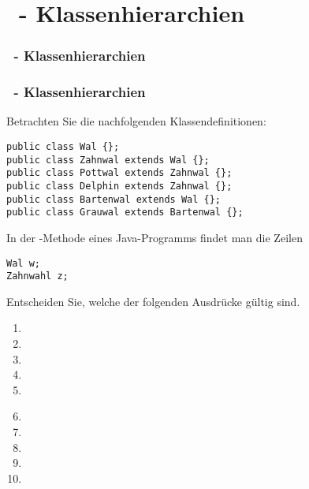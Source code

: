 \def\stitle{\theexercise\ - Klassenhierarchien}
\section{\stitle}
\begin{frame}%
  \frametitle{\stitle}%
\tableofcontents[current]
\end{frame}


\begin{frame}[fragile]%
  \frametitle{\stitle}%
Betrachten Sie die nachfolgenden Klassendefinitionen:

\begin{lstlisting}[style=java]
public class Wal {};
public class Zahnwal extends Wal {};
public class Pottwal extends Zahnwal {};
public class Delphin extends Zahnwal {};
public class Bartenwal extends Wal {};
public class Grauwal extends Bartenwal {};
\end{lstlisting}

In der -Methode eines Java-Programms findet man die Zeilen
\begin{lstlisting}[style=java,frame=none]
Wal w;
Zahnwahl z;
\end{lstlisting}

Entscheiden Sie, welche der folgenden Ausdr\"ucke g\"ultig sind.
\begin{center}
\begin{minipage}{0.49\textwidth}
\begin{enumerate}
\item {}
\item {}
\item {}
\item {}
\item {}
\end{enumerate}
\end{minipage}
\begin{minipage}{0.49\textwidth}
\begin{enumerate}
\setcounter{enumi}{5}
\item {}
\item {}
\item {}
\item {}
\item {}
\end{enumerate}
\end{minipage}
\end{center}
\end{frame}


